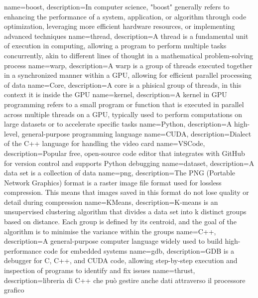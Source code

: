 {
    name=boost,
    description={In computer science, "boost" generally refers to enhancing the performance of a system, application, or algorithm through code optimization, leveraging more efficient hardware resources, or implementing advanced techniques}
}
{
    name=thread,
    description={A thread is a fundamental unit of execution in computing, allowing a program to perform multiple tasks concurrently, akin to different lines of thought in a mathematical problem-solving process}
}
{
    name=warp,
    description={A warp is a group of threads executed together in a synchronized manner within a GPU, allowing for efficient parallel processing of data}
}
{
name=Core,
description={A core is a phisical group of threads, in this context it is inside the GPU}
}
{
    name=kernel,
    description={A kernel in GPU programming refers to a small program or function that is executed in parallel across multiple threads on a GPU, typically used to perform computations on large datasets or to accelerate specific tasks}
}
{
    name=Python,
    description={A high-level, general-purpose programming language}
}
{
    name=CUDA,
    description={Dialect of the C++ language for handling the video card}
}
{
name=VSCode,
description={Popular free, open-source code editor that integrates with GitHub for version control and supports Python debugging}
}
{
    name=dataset,
    description={A data set is a collection of data}
}
{
    name=png,
    description={The PNG (Portable Network Graphics) format is a raster image file format used for lossless compression. This means that images saved in this format do not lose quality or detail during compression}
}
{
    name=KMeans,
    description={K-means is an unsupervised clustering algorithm that divides a data set into k distinct groups based on distance. Each group is defined by its centroid, and the goal of the algorithm is to minimise the variance within the groups}
}
{
    name=C++,
    description={A general-purpose computer language widely used to build high-performance code for embedded systems}
}
{
name=gdb,
description={GDB is a debugger for C, C++, and CUDA code, allowing step-by-step execution and inspection of programs to identify and fix issues}
}
{
    name=thrust,
    description={libreria di C++ che può gestire anche dati attraverso il processore grafico}
}
